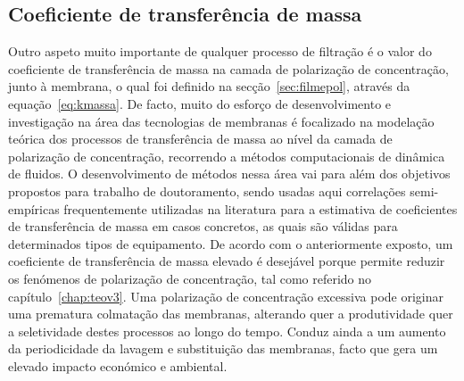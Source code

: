 \subsection{Coeficiente de transferência de massa} %
\label{sub:coef_massa_pra}
Outro aspeto muito importante de qualquer processo de filtração é o valor do coeficiente de transferência de massa na camada de polarização de concentração, junto à membrana, o qual foi definido na secção~\ref{sec:filmepol}, através da equação~\ref{eq:kmassa}. De facto, muito do esforço de desenvolvimento e investigação na área das tecnologias de membranas é focalizado na modelação teórica dos processos de transferência de massa ao nível da camada de polarização de concentração, recorrendo a métodos computacionais de dinâmica de fluidos. O desenvolvimento de métodos nessa área vai para além dos objetivos propostos para trabalho de doutoramento, sendo usadas aqui correlações semi-empíricas frequentemente utilizadas na literatura para a estimativa de coeficientes de transferência de massa em casos concretos, as quais são válidas para determinados tipos de equipamento. De acordo com o anteriormente exposto, um coeficiente de transferência de massa elevado é desejável porque permite reduzir os fenómenos de polarização de concentração, tal como referido no capítulo~\ref{chap:teov3}. Uma polarização de concentração excessiva pode originar uma prematura colmatação das membranas, alterando quer a produtividade quer a seletividade destes processos ao longo do tempo. Conduz ainda a um aumento da periodicidade da lavagem e substituição das membranas, facto que gera um elevado impacto económico e ambiental.

